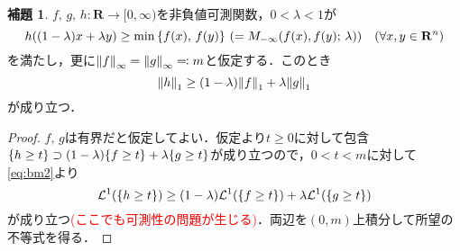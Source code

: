 \documentclass[a4j]{ltjsarticle}
\newcommand{\Rset}{\mathbf{R}}
\newcommand{\Lm}{\mathcal{L}}
\newcommand{\1}{\bm{1}}
\newcommand{\M}[4]{M_{#1}\qty(#2,#3;\,#4)}
\numberwithin{equation}{section}
\theoremstyle{definition}
\newtheorem{lem}[thm]{補題}
\begin{document}
\begin{lem}\label{lem:bbl_1}
    $f,\,g,\,h\colon \Rset\to [0,\infty)$を非負値可測関数，$0<\lambda<1$が
    \begin{equation}
        h((1-\lambda)x+\lambda y)\geq \min\qty{f(x),\,f(y)}\ (=\M{-\infty}{f(x)}{f(y)}{\lambda})\quad (\forall x,y\in\Rset^n)\label{eq:bbl_assump}
    \end{equation}
    を満たし，更に$\norm{f}_{\infty}=\norm{g}_{\infty}\eqqcolon m$と仮定する．このとき
    \begin{equation}
        \norm{h}_1\geq (1-\lambda)\norm{f}_1+\lambda\norm{g}_1
    \end{equation}
    が成り立つ．
\end{lem}
\begin{proof}
    $f,\,g$は有界だと仮定してよい．仮定より$t\geq0$に対して包含$\qty{h\geq t}\supset (1-\lambda)\qty{f\geq t}+\lambda\qty{g\geq t}$が成り立つので，$0<t<m$に対して\eqref{eq:bm2}より
    \begin{equation}
        \Lm^1(\qty{h\geq t})\geq (1-\lambda)\Lm^1(\qty{f\geq t})+\lambda \Lm^1(\qty{g\geq t})
    \end{equation}
    が成り立つ\textcolor{red}{(ここでも可測性の問題が生じる)}．両辺を$(0,m)$上積分して所望の不等式を得る．
\end{proof}
\end{document}
